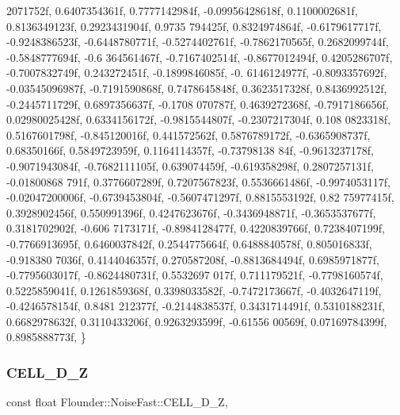 \begin{DoxyCode}
      2071752f, 0.6407354361f, 0.7777142984f, -0.09956428618f, 0.1100002681f, 0.8136349123f, 0.2923431904f, 0.9735
      794425f, 0.8324974864f, -0.6179617717f,
        -0.9248386523f, -0.6448780771f, -0.5274402761f, -0.7862170565f, 0.2682099744f, -0.5848777694f, -0.6
      364561467f, -0.7167402514f, -0.8677012494f, 0.4205286707f, -0.7007832749f, 0.243272451f, -0.1899846085f, -0.
      6146124977f, -0.8093357692f, -0.03545096987f,
        -0.7191590868f, 0.7478645848f, 0.3623517328f, 0.8436992512f, -0.2445711729f, 0.6897356637f, -0.1708
      070787f, 0.4639272368f, -0.7917186656f, 0.02980025428f, 0.6334156172f, -0.9815544807f, -0.2307217304f, 0.108
      0823318f, 0.5167601798f, -0.845120016f,
        0.441572562f, 0.5876789172f, -0.6365908737f, 0.68350166f, 0.5849723959f, 0.1164114357f, -0.73798138
      84f, -0.9613237178f, -0.9071943084f, -0.7682111105f, 0.639074459f, -0.619358298f, 0.2807257131f, -0.01800868
      791f, 0.3776607289f, 0.7207567823f,
        0.5536661486f, -0.9974053117f, -0.02047200006f, -0.6739453804f, -0.5607471297f, 0.8815553192f, 0.82
      75977415f, 0.3928902456f, 0.550991396f, 0.4247623676f, -0.3436948871f, -0.3653537677f, 0.3181702902f, -0.606
      7173171f, -0.8984128477f, 0.4220839766f,
        0.7238407199f, -0.7766913695f, 0.6460037842f, 0.2544775664f, 0.6488840578f, 0.805016833f, -0.918380
      7036f, 0.4144046357f, 0.270587208f, -0.8813684494f, 0.6985971877f, -0.7795603017f, -0.8624480731f, 0.5532697
      017f, 0.711179521f, -0.7798160574f,
        0.5225859041f, 0.1261859368f, 0.3398033582f, -0.7472173667f, -0.4032647119f, -0.4246578154f, 0.8481
      212377f, -0.2144838537f, 0.3431714491f, 0.5310188231f, 0.6682978632f, 0.3110433206f, 0.9263293599f, -0.61556
      00569f, 0.07169784399f, 0.8985888773f,
    \}
\end{DoxyCode}
\mbox{\label{class_flounder_1_1_noise_fast_a229b7ab712030f1505a85a86ccbfeed5}} 
\subsubsection{\texorpdfstring{C\+E\+L\+L\+\_\+D\+\_\+Z}{CELL\_3D\_Z}}
{\footnotesize\ttfamily const float Flounder\+::\+Noise\+Fast\+::\+C\+E\+L\+L\+\_\+D\+\_\+Z\hspace{0.3cm}{\ttfamily [static]}, {\ttfamily [private]}}

